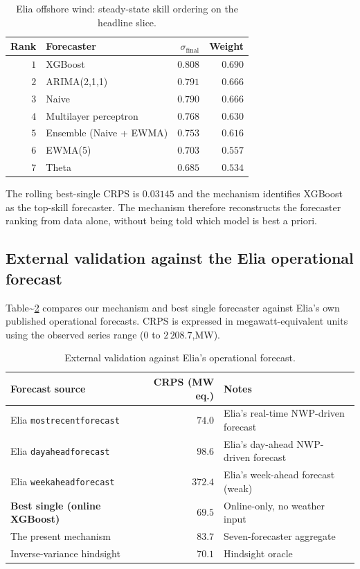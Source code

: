 \documentclass[
  11pt,
  a4paper,
  oneside]{report}
\begin{document}
\begin{table}[h]
\centering
\small
\begin{tabular}{rlrr}
\toprule
Rank & Forecaster & $\sigma_\mathrm{final}$ & Weight \\
\midrule
$1$ & XGBoost & $0.808$ & $0.690$ \\
$2$ & ARIMA(2,1,1) & $0.791$ & $0.666$ \\
$3$ & Naive & $0.790$ & $0.666$ \\
$4$ & Multilayer perceptron & $0.768$ & $0.630$ \\
$5$ & Ensemble (Naive + EWMA) & $0.753$ & $0.616$ \\
$6$ & EWMA(5) & $0.703$ & $0.557$ \\
$7$ & Theta & $0.685$ & $0.534$ \\
\bottomrule
\end{tabular}
\caption{Elia offshore wind: steady-state skill ordering on the
headline slice.}
\label{tab:wind-skill-ordering}
\end{table}

The rolling best-single CRPS is \(0.03145\) and the mechanism identifies
XGBoost as the top-skill forecaster. The mechanism therefore
reconstructs the forecaster ranking from data alone, without being told
which model is best a priori.

\subsection{External validation against the Elia operational
forecast}\label{external-validation-against-the-elia-operational-forecast}

Table\textasciitilde{}\ref{tab:elia-operational} compares our mechanism
and best single forecaster against Elia's own published operational
forecasts. CRPS is expressed in megawatt-equivalent units using the
observed series range (\(0\) to \(2\,208.7\),MW).

\begin{table}[h]
\centering
\small
\begin{tabular}{lrp{5cm}}
\toprule
Forecast source & CRPS (MW eq.) & Notes \\
\midrule
Elia \texttt{mostrecentforecast} & $74.0$
  & Elia's real-time NWP-driven forecast \\
Elia \texttt{dayaheadforecast} & $98.6$
  & Elia's day-ahead NWP-driven forecast \\
Elia \texttt{weekaheadforecast} & $372.4$
  & Elia's week-ahead forecast (weak) \\
\textbf{Best single (online XGBoost)} & $\mathbf{69.5}$
  & Online-only, no weather input \\
The present mechanism & $83.7$ & Seven-forecaster aggregate \\
Inverse-variance hindsight & $70.1$ & Hindsight oracle \\
\bottomrule
\end{tabular}
\caption{External validation against Elia's operational forecast.}
\label{tab:elia-operational}
\end{table}
\end{document}

